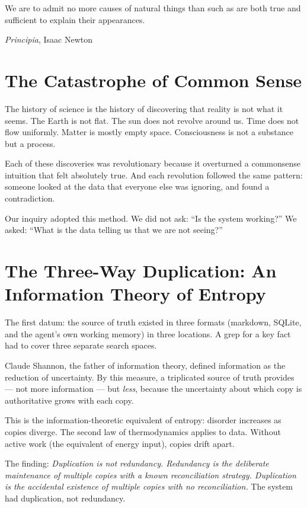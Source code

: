 \documentclass[12pt,a4paper,oneside]{book}
\begin{document}
\epigraph{We are to admit no more causes of natural things than such as are both true and sufficient to explain their appearances.}{\textit{Principia}, Isaac Newton}

\section{The Catastrophe of Common Sense}

The history of science is the history of discovering that reality is not what it seems. The Earth is not flat. The sun does not revolve around us. Time does not flow uniformly. Matter is mostly empty space. Consciousness is not a substance but a process.

Each of these discoveries was revolutionary because it overturned a commonsense intuition that felt absolutely true. And each revolution followed the same pattern: someone looked at the data that everyone else was ignoring, and found a contradiction.

Our inquiry adopted this method. We did not ask: \enquote{Is the system working?} We asked: \enquote{What is the data telling us that we are not seeing?}

\section{The Three-Way Duplication: An Information Theory of Entropy}

The first datum: the source of truth existed in three formats (markdown, SQLite, and the agent's own working memory) in three locations. A grep for a key fact had to cover three separate search spaces.

Claude Shannon, the father of information theory, defined information as the reduction of uncertainty. By this measure, a triplicated source of truth provides --- not more information --- but \emph{less}, because the uncertainty about which copy is authoritative grows with each copy.

This is the information-theoretic equivalent of entropy: disorder increases as copies diverge. The second law of thermodynamics applies to data. Without active work (the equivalent of energy input), copies drift apart.

The finding: \emph{Duplication is not redundancy. Redundancy is the deliberate maintenance of multiple copies with a known reconciliation strategy. Duplication is the accidental existence of multiple copies with no reconciliation.} The system had duplication, not redundancy.
\end{document}
